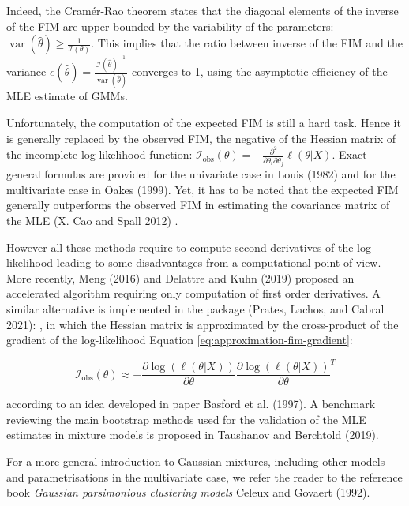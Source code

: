 Indeed, the Cramér-Rao theorem states that the diagonal elements of the
inverse of the FIM are upper bounded by the variability of the
parameters:
\(\operatorname{var}(\hat{\theta}) \ge \frac{1}{\mathcal{I}(\theta)}\). This
implies that the ratio between inverse of the FIM and the variance
\(e(\hat{\theta})=\frac{\mathcal{I}(\hat{\theta})^{-1}}{\operatorname{var}(\hat{\theta})}\)
converges to 1, using the asymptotic efficiency of the MLE estimate of
GMMs.

Unfortunately, the computation of the expected FIM is still a hard task.
Hence it is generally replaced by the observed FIM, the negative of the
Hessian matrix of the incomplete log-likelihood function:
\(\mathcal{I}_\text{obs}(\theta)= -\frac{\partial^2}{\partial \theta_i \partial \theta_j} \ell(\theta|X)\).
Exact general formulas are provided for the univariate case in Louis (1982)
and for the multivariate case in Oakes (1999). Yet, it has to be noted that
the expected FIM generally outperforms the observed FIM in estimating
the covariance matrix of the MLE (X. Cao and Spall 2012) .

However all these methods require to compute second derivatives of the
log-likelihood leading to some disadvantages from a computational point
of view. More recently, Meng (2016) and Delattre and Kuhn (2019) proposed an
accelerated algorithm requiring only computation of first order
derivatives. A similar alternative is implemented in the
 package (Prates, Lachos, and Cabral 2021):
, in which the Hessian matrix is approximated by the cross-product of the
gradient of the log-likelihood Equation
\eqref{eq:approximation-fim-gradient}:

\begin{equation}
        \mathcal{I}_{\text{obs}}(\theta) \approx - \frac{\partial \log (\ell (\theta|X))}{\partial \theta} \frac{\partial \log (\ell (\theta|X))}{\partial \theta}^T
    \label{eq:approximation-fim-gradient}
\end{equation}

according to an idea developed in paper Basford et al. (1997). A benchmark
reviewing the main bootstrap methods used for the validation of the MLE
estimates in mixture models is proposed in Taushanov and Berchtold (2019).

For a more general introduction to Gaussian mixtures, including other
models and parametrisations in the multivariate case, we refer the
reader to the reference book \emph{Gaussian parsimonious clustering models}
Celeux and Govaert (1992).

